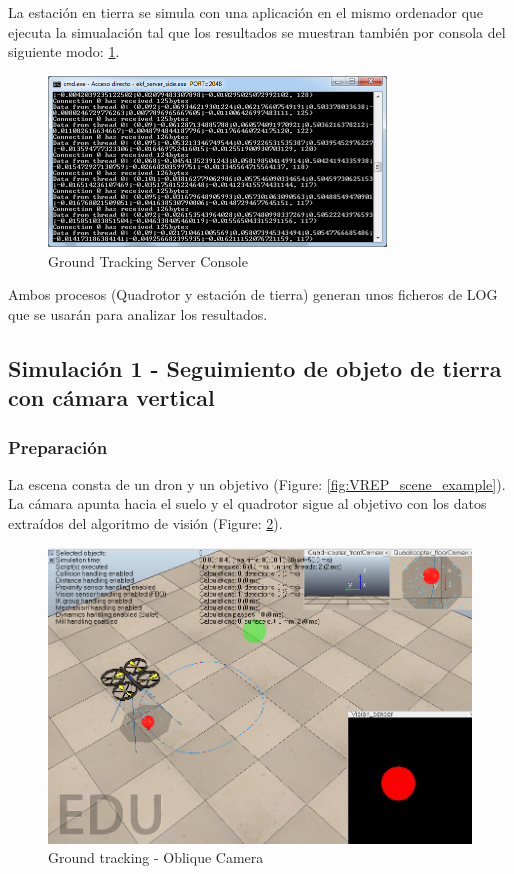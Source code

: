 La estación en tierra se simula con una aplicaci\'on en el mismo ordenador que ejecuta la simualaci\'on tal que los resultados se muestran tambi\'en por consola del siguiente modo: \ref{fig:Ground_Tracking_Server_Console}.

\begin{figure}[ht]
	\centering
	\includegraphics[width=0.8\textwidth,natwidth=677,natheight=342]{../Images/c3/ground_tracking_server_console.png}
	\caption{Ground Tracking Server Console}
	\label{fig:Ground_Tracking_Server_Console}
\end{figure}

Ambos procesos (Quadrotor y estaci\'on de tierra) generan unos ficheros de LOG que se usar\'an para analizar los resultados.

\subsection{Simulaci\'on 1 - Seguimiento de objeto de tierra con c\'amara vertical}
\subsubsection{Preparaci\'on}
La escena consta de un dron y un objetivo (Figure: \ref{fig:VREP_scene_example}). La c\'amara apunta hacia el suelo y el quadrotor sigue al objetivo con los datos extraídos del algoritmo de visi\'on (Figure: \ref{fig:ground_tracking_scene_vertical}).

\begin{figure}[ht]
	\centering
	\includegraphics[width=0.65\linewidth]{../Images/c3/ground_tracking_scene_vertical}
	\caption{Ground tracking - Oblique Camera}
	\label{fig:ground_tracking_scene_vertical}
\end{figure}

